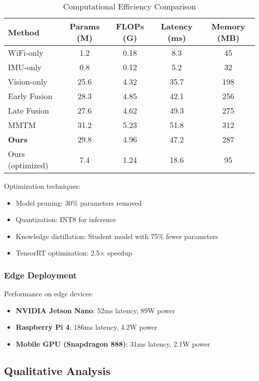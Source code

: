 \documentclass[journal]{IEEEtran}
\begin{document}
\begin{table}[t]
\centering
\caption{Computational Efficiency Comparison}
\label{tab:efficiency}
\begin{tabular}{lcccc}
\toprule
Method & Params (M) & FLOPs (G) & Latency (ms) & Memory (MB) \\
\midrule
WiFi-only & 1.2 & 0.18 & 8.3 & 45 \\
IMU-only & 0.8 & 0.12 & 5.2 & 32 \\
Vision-only & 25.6 & 4.32 & 35.7 & 198 \\
\midrule
Early Fusion & 28.3 & 4.85 & 42.1 & 256 \\
Late Fusion & 27.6 & 4.62 & 49.3 & 275 \\
MMTM & 31.2 & 5.23 & 51.8 & 312 \\
\midrule
\textbf{Ours} & 29.8 & 4.96 & 47.2 & 287 \\
Ours (optimized) & 7.4 & 1.24 & 18.6 & 95 \\
\bottomrule
\end{tabular}
\end{table}

Optimization techniques:
\begin{itemize}
\item Model pruning: 30\% parameters removed
\item Quantization: INT8 for inference
\item Knowledge distillation: Student model with 75\% fewer parameters
\item TensorRT optimization: 2.5× speedup
\end{itemize}

\subsubsection{Edge Deployment}

Performance on edge devices:

\begin{itemize}
\item \textbf{NVIDIA Jetson Nano}: 52ms latency, 89W power
\item \textbf{Raspberry Pi 4}: 186ms latency, 4.2W power
\item \textbf{Mobile GPU (Snapdragon 888)}: 31ms latency, 2.1W power
\end{itemize}

\subsection{Qualitative Analysis}
\end{document}
